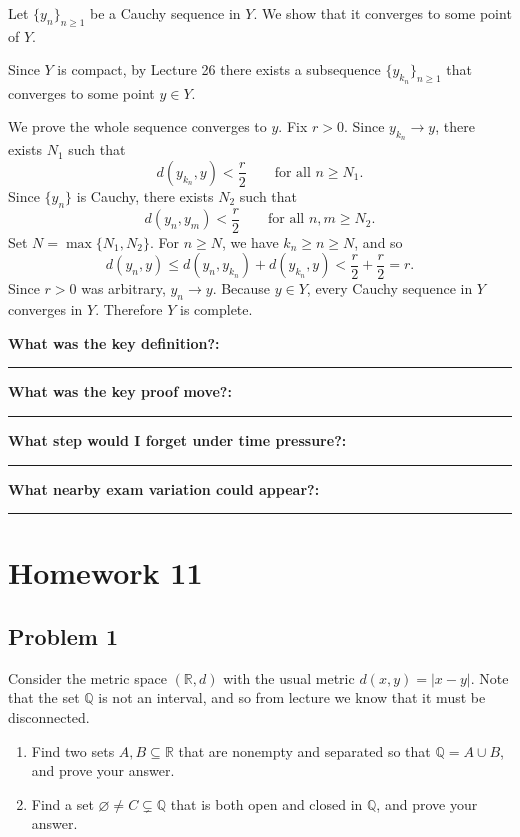 \documentclass[12pt]{article}
\newcommand{\R}{\mathbb{R}}
\newcommand{\Q}{\mathbb{Q}}
\newcommand{\writespace}[1]{\vspace*{#1}}
\newcommand{\fillfieldbig}[2]{%
  \par\noindent\textbf{#1:}\par
  \writespace{#2}
  \noindent\rule{\linewidth}{0.35pt}\par\vspace{0.15in}%
}
\newenvironment{problemstatementbox}[1]{%
  \begin{tcolorbox}[
    enhanced,
    breakable,
    colback=probblue,
    colframe=blue!55!black,
    fonttitle=\bfseries,
    title={Problem Statement\hfill #1}
  ]
}{%
  \end{tcolorbox}
}
\newenvironment{solutionbox}[1]{%
  \begin{tcolorbox}[
    enhanced,
    breakable,
    colback=solgreen,
    colframe=green!45!black,
    fonttitle=\bfseries,
    title={#1}
  ]
}{%
  \end{tcolorbox}
}
\newcommand{\reflectionpage}[1]{%
  \begin{tcolorbox}[
    enhanced,
    colback=reflectcyan,
    colframe=cyan!55!black,
    fonttitle=\bfseries,
    title={Reflection \& Variation\hfill #1},
    height=8.45in
  ]
  \fillfieldbig{What was the key definition?}{1.15in}
  \fillfieldbig{What was the key proof move?}{1.15in}
  \fillfieldbig{What step would I forget under time pressure?}{1.15in}
  \fillfieldbig{What nearby exam variation could appear?}{1.35in}
  \end{tcolorbox}
}
\begin{document}
\newpage
\begin{solutionbox}{Official Solution (Professor)}
Let \(\{y_n\}_{n\ge1}\) be a Cauchy sequence in \(Y\). We show that it converges to some point of \(Y\).

Since \(Y\) is compact, by Lecture 26 there exists a subsequence \(\{y_{k_n}\}_{n\ge1}\) that converges to some point \(y\in Y\).

We prove the whole sequence converges to \(y\). Fix \(r>0\). Since \(y_{k_n}\to y\), there exists \(N_1\) such that
\[
  d(y_{k_n},y)<\frac r2
  \qquad\text{for all }n\ge N_1.
\]
Since \(\{y_n\}\) is Cauchy, there exists \(N_2\) such that
\[
  d(y_n,y_m)<\frac r2
  \qquad\text{for all }n,m\ge N_2.
\]
Set \(N=\max\{N_1,N_2\}\). For \(n\ge N\), we have \(k_n\ge n\ge N\), and so
\[
  d(y_n,y)\le d(y_n,y_{k_n})+d(y_{k_n},y)<\frac r2+\frac r2=r.
\]
Since \(r>0\) was arbitrary, \(y_n\to y\). Because \(y\in Y\), every Cauchy sequence in \(Y\) converges in \(Y\). Therefore \(Y\) is complete.
\end{solutionbox}

\newpage
\reflectionpage{Homework 10, Problem 4}

\newpage
\section{Homework 11}

\newpage
\subsection{Problem 1}

\begin{problemstatementbox}{Homework 11, Problem 1}
Consider the metric space \((\R,d)\) with the usual metric \(d(x,y)=|x-y|\). Note that the set \(\Q\) is not an interval, and so from lecture we know that it must be disconnected.

\begin{enumerate}[label=(\alph*)]
  \item Find two sets \(A,B\subseteq\R\) that are nonempty and separated so that \(\Q=A\cup B\), and prove your answer.
  \item Find a set \(\varnothing\neq C\subsetneq\Q\) that is both open and closed in \(\Q\), and prove your answer.
\end{enumerate}
\end{problemstatementbox}
\end{document}
